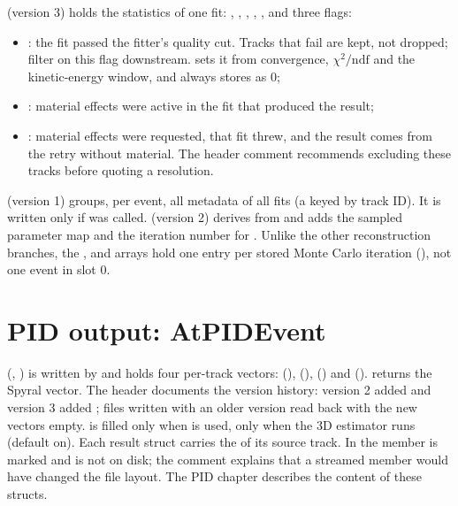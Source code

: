  (version 3) holds the statistics of one fit: , ,
, , , and three flags:
\begin{itemize}
\item {}: the fit passed the fitter's quality cut. Tracks that fail are kept, not
  dropped; filter on this flag downstream.  sets it from convergence, $\chi^2/\mathrm{ndf}$
  and the kinetic-energy window, and always stores  as 0;
\item {}: material effects were active in the fit that produced the result;
\item {}: material effects were requested, that fit threw, and the result
  comes from the retry without material. The header comment recommends excluding these tracks before
  quoting a resolution.
\end{itemize}
 (version 1) groups, per event, all metadata of all fits (a
 keyed by track ID). It is written only
if  was called.  (version 2)
derives from  and adds the sampled parameter map and the iteration number for
. Unlike the other reconstruction branches, the ,  and
 arrays hold one entry per stored Monte Carlo iteration
(), not one event in slot 0.

\section{PID output: AtPIDEvent}
\label{sec:dm-pidevent}

 (, ) is written by 
and holds four per-track vectors:  (), 
(),  () and
 ().  returns the Spyral
vector. The header documents the version history: version 2 added  and version 3 added
; files written with an older version read back with the new vectors empty.
 is filled only when  is used,  only
when the 3D estimator runs (default on). Each result struct carries the  of its source
track. In  the member  is marked \code{//!} and is not on disk; the
comment explains that a streamed member would have changed the file layout. The PID chapter describes
the content of these structs.

